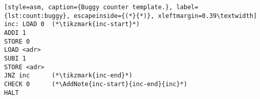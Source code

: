 \begin{lstlisting}[style=asm, caption={Buggy counter template.}, label={lst:count:buggy}, escapeinside={(*}{*)}, xleftmargin=0.39\textwidth]
inc: LOAD 0  (*\tikzmark{inc-start}*)
ADDI 1
STORE 0
LOAD <adr>
SUBI 1
STORE <adr>
JNZ inc      (*\tikzmark{inc-end}*)
CHECK 0      (*\AddNote{inc-start}{inc-end}{inc}*)
HALT
\end{lstlisting}

